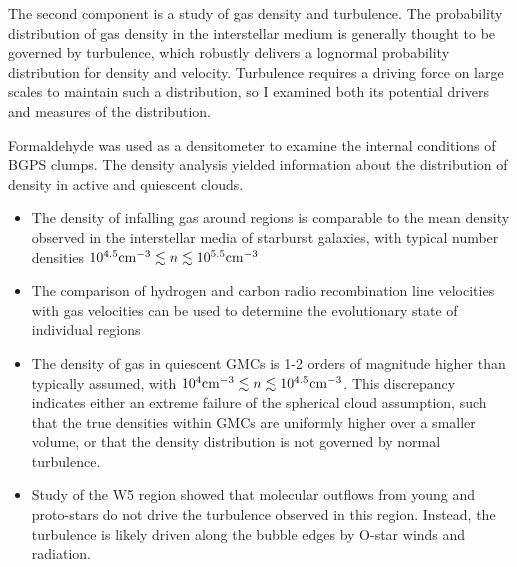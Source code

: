 The second component is a study of gas density and turbulence. The probability
distribution of gas density in the interstellar medium is generally thought to
be governed by turbulence, which robustly delivers a lognormal probability
distribution for density and velocity.  Turbulence requires a driving force on
large scales to maintain such a distribution, so I examined both its potential
drivers and measures of the distribution.

Formaldehyde was used as a densitometer to examine the internal conditions of
BGPS clumps.   The density analysis yielded information about the distribution
of density in active and quiescent clouds.

\begin{itemize}
    \item The density of infalling gas around \uchii regions is comparable to the
        mean density observed in the interstellar media of starburst galaxies,
        with typical number densities $10^{4.5}\textrm{cm}^{-3}\lesssim n \lesssim10^{5.5}\textrm{cm}^{-3}$
    \item The comparison of hydrogen and carbon radio recombination line
        velocities with \formaldehyde gas velocities can be used to determine
        the evolutionary state of individual \uchii regions
    \item The density of gas in quiescent GMCs is 1-2 orders of magnitude
        higher than typically assumed, with $10^4\textrm{cm}^{-3}\lesssim n
        \lesssim10^{4.5}\textrm{cm}^{-3}$.  This discrepancy indicates either an
        extreme failure of the spherical cloud assumption, such that the true
        densities within GMCs are uniformly higher over a smaller volume, or
        that the density distribution is not governed by normal turbulence.
    \item Study of the W5 region showed that molecular outflows from young and
        proto-stars do not drive the turbulence observed in this region.  Instead,
        the turbulence is likely driven along the bubble edges by O-star winds and
        radiation.
\end{itemize}





